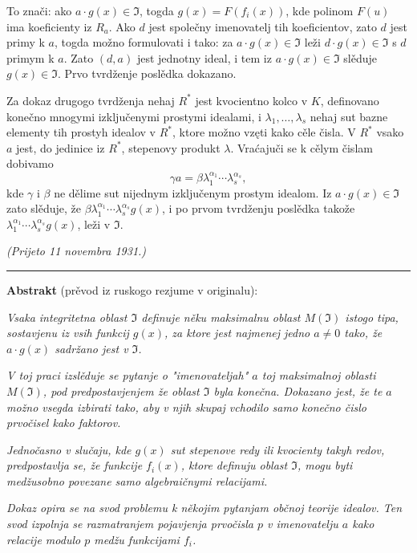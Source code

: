 \documentclass[11pt]{article}
\begin{document}
To znači: ako \(a\cdot g(x)\in\mathfrak{I}\), togda \(g(x)=F(f_i(x))\), kde polinom \(F(u)\) ima koeficienty iz \(R_a\). Ako \(d\) jest společny imenovatelj tih koeficientov, zato \(d\) jest primy k \(a\), togda možno formulovati i tako: za \(a\cdot g(x)\in\mathfrak{I}\) leži \(d\cdot g(x)\in\mathfrak{I}\) s \(d\) primym k \(a\). Zato \((d,a)\) jest jednotny ideal, i tem iz \(a\cdot g(x)\in\mathfrak{I}\) slěduje \(g(x)\in\mathfrak{I}\). Prvo tvrdženje poslědka dokazano.

Za dokaz drugogo tvrdženja nehaj \(R^*\) jest kvocientno kolco v \(K\), definovano konečno mnogymi izključenymi prostymi idealami, i \(\lambda_1,\ldots,\lambda_s\) nehaj sut bazne elementy tih prostyh idealov v \(R^*\), ktore možno vzęti kako cěle čisla. V \(R^*\) vsako \(a\) jest, do jedinice iz \(R^*\), stepenovy produkt \(\lambda\). Vraćajuči se k cělym čislam dobivamo
\[
\gamma a=\beta\lambda_1^{\alpha_1}\cdots\lambda_s^{\alpha_s},
\]
kde \(\gamma\) i \(\beta\) ne dělime sut nijednym izključenym prostym idealom. Iz \(a\cdot g(x)\in\mathfrak{I}\) zato slěduje, že \(\beta\lambda_1^{\alpha_1}\cdots\lambda_s^{\alpha_s}g(x)\), i po prvom tvrdženju poslědka takože \(\lambda_1^{\alpha_1}\cdots\lambda_s^{\alpha_s}g(x)\), leži v \(\mathfrak{I}\).

\begin{flushright}
\textit{(Prijeto 11 novembra 1931.)}
\end{flushright}

\bigskip
\noindent\rule{\textwidth}{0.4pt}

\medskip
\noindent\textbf{Abstrakt} (prěvod iz ruskogo rezjume v originalu):

\smallskip
\textit{Vsaka integritetna oblast \(\mathfrak{I}\) definuje něku maksimalnu oblast \(M(\mathfrak{I})\) istogo tipa, sostavjenu iz vsih funkcij \(g(x)\), za ktore jest najmenej jedno \(a\ne0\) tako, že \(a\cdot g(x)\) sadržano jest v \(\mathfrak{I}\).}

\textit{V toj praci izslěduje se pytanje o "imenovateljah" \(a\) toj maksimalnoj oblasti \(M(\mathfrak{I})\), pod predpostavjenjem že oblast \(\mathfrak{I}\) byla konečna. Dokazano jest, že te \(a\) možno vsegda izbirati tako, aby v njih skupaj vchodilo samo konečno čislo prvočisel kako faktorov.}

\textit{Jednočasno v slučaju, kde \(g(x)\) sut stepenove redy ili kvocienty takyh redov, predpostavlja se, že funkcije \(f_i(x)\), ktore definuju oblast \(\mathfrak{I}\), mogu byti medžusobno povezane samo algebraičnymi relacijami.}

\textit{Dokaz opira se na svod problemu k někojim pytanjam občnoj teorije idealov. Ten svod izpolnja se razmatranjem pojavjenja prvočisla \(p\) v imenovatelju \(a\) kako relacije modulo \(p\) medžu funkcijami \(f_i\).}
\end{document}

